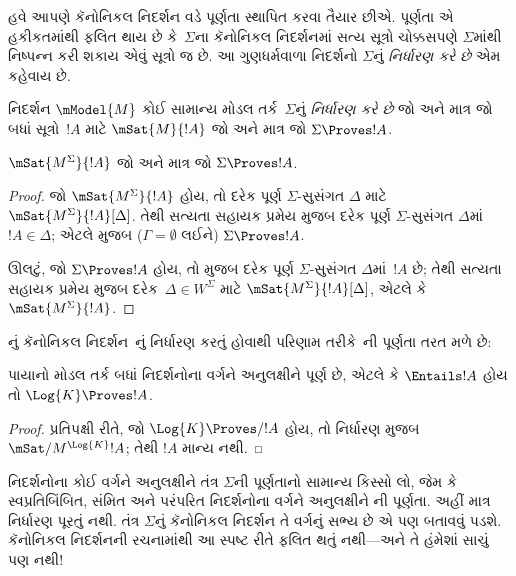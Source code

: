 
\label{guunit:OLP-0448}


હવે આપણે કૅનોનિકલ નિદર્શન વડે પૂર્ણતા સ્થાપિત કરવા તૈયાર છીએ.
પૂર્ણતા એ હકીકતમાંથી ફલિત થાય છે કે~$\Sigma$ના કૅનોનિકલ નિદર્શનમાં
સત્ય સૂત્રો ચોક્કસપણે $\Sigma$માંથી નિષ્પન્ન કરી શકાય એવું સૂત્રો જ છે.
આ ગુણધર્મવાળા નિદર્શનો $\Sigma$નું \emph{નિર્ધારણ કરે છે} એમ કહેવાય છે.

\begin{defn}
  નિદર્શન $\mModel{M}$ કોઈ સામાન્ય મોડલ તર્ક~$\Sigma$નું
  \emph{નિર્ધારણ કરે છે} જો અને માત્ર જો બધાં સૂત્રો~$!A$
  માટે $\mSat{M}{!A}$ જો અને માત્ર જો $\Sigma \Proves !A$.
\end{defn}

\begin{thm}[નિર્ધારણ]
   $\mSat{M^\Sigma}{!A}$ જો અને માત્ર જો $\Sigma \Proves !A$.
\end{thm}

\begin{proof}
  જો $\mSat{M^\Sigma}{!A}$ હોય, તો દરેક પૂર્ણ
  $\Sigma$-સુસંગત $\Delta$ માટે $\mSat{M^\Sigma}{!A}[\Delta]$.
  તેથી સત્યતા સહાયક પ્રમેય મુજબ દરેક પૂર્ણ $\Sigma$-સુસંગત
  $\Delta$માં $!A \in \Delta$; એટલે
   મુજબ ($\Gamma =
  \emptyset$ લઈને) $\Sigma \Proves !A$.

  ઊલટું, જો $\Sigma \Proves !A$ હોય, તો
  મુજબ દરેક પૂર્ણ $\Sigma$-સુસંગત $\Delta$માં~$!A$ છે; તેથી
  સત્યતા સહાયક પ્રમેય મુજબ દરેક~$\Delta \in W^\Sigma$ માટે
  $\mSat{M^\Sigma}{!A}[\Delta]$, એટલે કે
  $\mSat{M^\Sigma}{!A}$.
\end{proof}

નું કૅનોનિકલ નિદર્શન~નું નિર્ધારણ કરતું હોવાથી
પરિણામ તરીકે~ની પૂર્ણતા તરત મળે છે:

\begin{cor}
  પાયાનો મોડલ તર્ક  બધાં નિદર્શનોના વર્ગને અનુલક્ષીને પૂર્ણ
  છે, એટલે કે $\Entails !A$ હોય તો $\Log{K} \Proves !A$.
\end{cor}

\begin{proof}
  પ્રતિપક્ષી રીતે, જો $\Log{K} \Proves/ !A$ હોય, તો નિર્ધારણ મુજબ
  $\mSat/{M^{\Log{K}}}{!A}$; તેથી $!A$ માન્ય નથી.
\end{proof}

નિદર્શનોના કોઈ વર્ગને અનુલક્ષીને તંત્ર $\Sigma$ની પૂર્ણતાનો સામાન્ય
કિસ્સો લો, જેમ કે સ્વપ્રતિબિંબિત, સંમિત અને પરંપરિત નિદર્શનોના વર્ગને
અનુલક્ષીને ની પૂર્ણતા. અહીં માત્ર નિર્ધારણ પૂરતું નથી.
તંત્ર $\Sigma$નું કૅનોનિકલ નિદર્શન તે વર્ગનું સભ્ય છે એ પણ બતાવવું
પડશે. કૅનોનિકલ નિદર્શનની રચનામાંથી આ સ્પષ્ટ રીતે ફલિત થતું નથી—અને
તે હંમેશાં સાચું પણ નથી!
\endgroup

